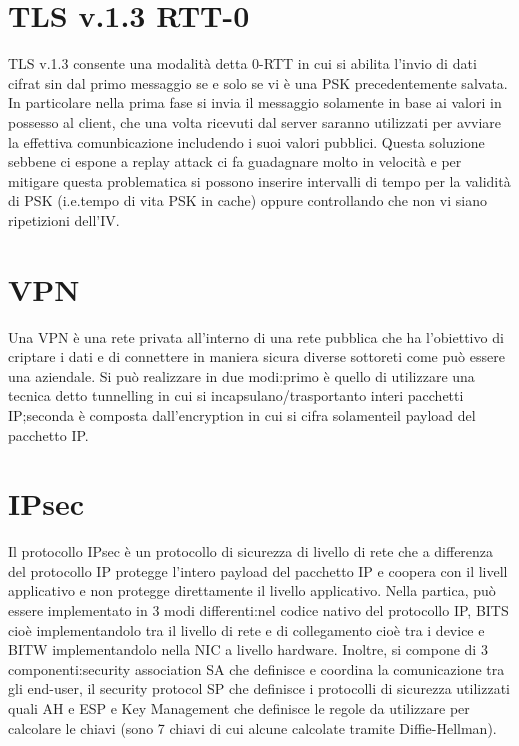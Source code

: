 \documentclass[a4paper,draft]{article}
\begin{document}
\section{TLS v.1.3 RTT-0}
TLS v.1.3 consente una modalità detta 0-RTT in cui si abilita l'invio di dati cifrat sin dal primo messaggio se e solo se vi è una PSK precedentemente salvata\@. In particolare nella prima fase si invia il messaggio solamente in base ai valori in possesso al client, che una volta ricevuti dal server saranno utilizzati per avviare la effettiva comunbicazione includendo i suoi valori pubblici\@. Questa soluzione sebbene ci espone a replay attack ci fa guadagnare molto in velocità e per mitigare questa problematica si possono inserire intervalli di tempo per la validità di PSK (i.e.tempo di vita PSK in cache) oppure controllando che non vi siano ripetizioni dell'IV\@.
\section{VPN}
Una VPN è una rete privata all'interno di una rete pubblica che ha l'obiettivo di criptare i dati e di connettere in maniera sicura diverse sottoreti come può essere una aziendale\@. Si può realizzare in due modi:\@il primo è quello di utilizzare una tecnica detto tunnelling in cui si incapsulano/trasportanto interi pacchetti IP;\@la seconda è composta dall'encryption in cui si cifra solamenteil payload del pacchetto IP\@.
\section{IPsec}
Il protocollo IPsec è un protocollo di sicurezza di livello di rete che a differenza del protocollo IP protegge l'intero payload del pacchetto IP e coopera con il livell applicativo e non protegge direttamente il livello applicativo\@. Nella partica, può essere implementato in 3 modi differenti:\@inserendo nel codice nativo del protocollo IP, BITS cioè implementandolo tra il livello di rete e di collegamento cioè tra i device e BITW implementandolo nella NIC a livello hardware\@.\newline
Inoltre, si compone di 3 componenti:\@la security association SA che definisce e coordina la comunicazione tra gli end-user, il security protocol SP che definisce i protocolli di sicurezza utilizzati quali AH e ESP e Key Management che definisce le regole da utilizzare per calcolare le chiavi (sono 7 chiavi di cui alcune calcolate tramite Diffie-Hellman)\@.
\end{document}
